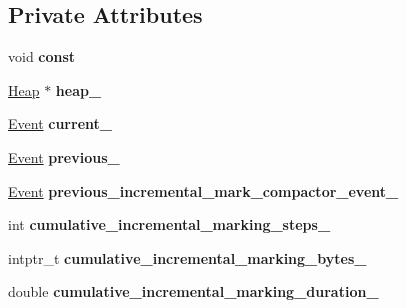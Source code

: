 \subsection*{Private Attributes}
\begin{DoxyCompactItemize}
\item 
void {\bfseries const}\hypertarget{classv8_1_1internal_1_1_g_c_tracer_a73ee28ad46fb60fb0200f5724576c5fa}{}\label{classv8_1_1internal_1_1_g_c_tracer_a73ee28ad46fb60fb0200f5724576c5fa}

\item 
\hyperlink{classv8_1_1internal_1_1_heap}{Heap} $\ast$ {\bfseries heap\+\_\+}\hypertarget{classv8_1_1internal_1_1_g_c_tracer_ae674c990a8e82b6b0102910b814db34d}{}\label{classv8_1_1internal_1_1_g_c_tracer_ae674c990a8e82b6b0102910b814db34d}

\item 
\hyperlink{classv8_1_1internal_1_1_g_c_tracer_1_1_event}{Event} {\bfseries current\+\_\+}\hypertarget{classv8_1_1internal_1_1_g_c_tracer_a0a3e90d2f50583fe894fb909beea6c1d}{}\label{classv8_1_1internal_1_1_g_c_tracer_a0a3e90d2f50583fe894fb909beea6c1d}

\item 
\hyperlink{classv8_1_1internal_1_1_g_c_tracer_1_1_event}{Event} {\bfseries previous\+\_\+}\hypertarget{classv8_1_1internal_1_1_g_c_tracer_a2102a0f4546cdf683a0ec5508ce21098}{}\label{classv8_1_1internal_1_1_g_c_tracer_a2102a0f4546cdf683a0ec5508ce21098}

\item 
\hyperlink{classv8_1_1internal_1_1_g_c_tracer_1_1_event}{Event} {\bfseries previous\+\_\+incremental\+\_\+mark\+\_\+compactor\+\_\+event\+\_\+}\hypertarget{classv8_1_1internal_1_1_g_c_tracer_ad436d5d413ab01de403bb55d92fef86b}{}\label{classv8_1_1internal_1_1_g_c_tracer_ad436d5d413ab01de403bb55d92fef86b}

\item 
int {\bfseries cumulative\+\_\+incremental\+\_\+marking\+\_\+steps\+\_\+}\hypertarget{classv8_1_1internal_1_1_g_c_tracer_a18ec07a5cf3142216c74daee0809f4d8}{}\label{classv8_1_1internal_1_1_g_c_tracer_a18ec07a5cf3142216c74daee0809f4d8}

\item 
intptr\+\_\+t {\bfseries cumulative\+\_\+incremental\+\_\+marking\+\_\+bytes\+\_\+}\hypertarget{classv8_1_1internal_1_1_g_c_tracer_ade214ca3e2a7fc2321c22a45e6cb4467}{}\label{classv8_1_1internal_1_1_g_c_tracer_ade214ca3e2a7fc2321c22a45e6cb4467}

\item 
double {\bfseries cumulative\+\_\+incremental\+\_\+marking\+\_\+duration\+\_\+}\hypertarget{classv8_1_1internal_1_1_g_c_tracer_a979469ad2eb6016726d204f1c2ef5e53}{}\label{classv8_1_1internal_1_1_g_c_tracer_a979469ad2eb6016726d204f1c2ef5e53}


\end{DoxyCompactItemize}
